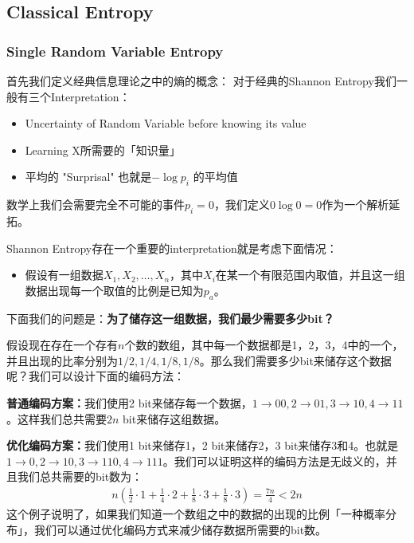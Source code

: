 \subsection{Classical Entropy}
\subsubsection{Single Random Variable Entropy}


首先我们定义经典信息理论之中的熵的概念：
对于经典的Shannon Entropy我们一般有三个Interpretation：
\begin{itemize}
  \item Uncertainty of Random Variable before knowing its value
  \item Learning X所需要的「知识量」
  \item 平均的 "Surprisal" 也就是$ -\log p_i $ 的平均值
\end{itemize}
数学上我们会需要完全不可能的事件$ p_i = 0 $，我们定义$ 0 \log 0 = 0 $作为一个解析延拓。

\bigskip
{}

Shannon Entropy存在一个重要的interpretation就是考虑下面情况：
\begin{itemize}
  \item 假设有一组数据$ X_1, X_2, \ldots, X_n $，其中$ X_i
    $在某一个有限范围内取值，并且这一组数据出现每一个取值的比例是已知为$ p_a $。
\end{itemize}
下面我们的问题是：\textbf{为了储存这一组数据，我们最少需要多少bit？}

\bigskip
{}

假设现在存在一个存有$ n $个数的数组，其中每一个数据都是1，2，3，4中的一个，并且出现的比率分别为$ 1/2,1/4,1/8,1/8
$。那么我们需要多少bit来储存这个数据呢？我们可以设计下面的编码方法：

\textbf{普通编码方案：}我们使用2 bit来储存每一个数据，$ 1 \to 00, 2 \to 01, 3 \to 10, 4
\to 11 $。这样我们总共需要$ 2n $ bit来储存这组数据。

\textbf{优化编码方案：}我们使用1 bit来储存1，2 bit来储存2，3 bit来储存3和4。也就是$ 1 \to 0, 2
\to 10, 3 \to 110, 4 \to 111 $。我们可以证明这样的编码方法是无歧义的，并且我们总共需要的bit数为：
\begin{align}
  n\left(\frac{1}{2} \cdot 1 + \frac{1}{4} \cdot 2 + \frac{1}{8}
  \cdot 3 + \frac{1}{8} \cdot 3\right) = \frac{7n}{4} < 2n
\end{align}
这个例子说明了，如果我们知道一个数组之中的数据的出现的比例「一种概率分布」，我们可以通过优化编码方式来减少储存数据所需要的bit数。

